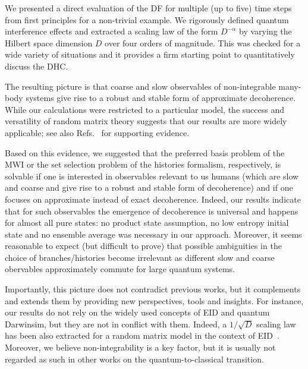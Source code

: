 \documentclass[pre,onecolumn,12pt,aps,longbibliography,nofootinbib]{revtex4-2}
\newcommand{\blue}[1]{#1}
\newcommand{\new}[1]{#1}
\begin{document}
We presented a direct evaluation of the DF for multiple (up to five) time steps from first principles for a non-trivial example. We rigorously defined quantum interference effects and extracted a scaling law of the form $D^{-\alpha}$ by varying the Hilbert space dimension $D$ over four orders of magnitude. \blue{This was checked for a wide variety of situations and it} provides a firm starting point to quantitatively discuss the DHC.

The resulting picture is that coarse and slow observables of non-integrable many-body systems give rise to a robust and stable form of approximate decoherence. \blue{While our calculations were restricted to a particular model, the success and versatility of random matrix theory suggests that our results are more widely applicable;} see also Refs.~\cite{VanKampenPhys1954, GemmerSteinigewegPRE2014, SchmidtkeGemmerPRE2016, NationPorrasPRE2020, AlbrechtBaunachArrasmithPRD2022, StrasbergEtAlPRA2023, StrasbergSP2023} for supporting evidence.

\blue{Based on this evidence, we suggested that the preferred basis problem of the MWI or the set selection problem of the histories formalism, respectively, is solvable if one is interested in observables relevant to us humans (which are slow and coarse and give rise to a robust and stable form of decoherence) and if one focuses on approximate instead of exact decoherence. Indeed, our results indicate that for such observables the emergence of decoherence is universal and happens for almost all pure states: no product state assumption, no low entropy initial state and no ensemble average was necessary in our approach. Moreover, it seems reasonable to expect (but difficult to prove) that possible ambiguities in the choice of branches/histories become irrelevant as different slow and coarse obervables approximately commute for large quantum systems.}

\new{Importantly,} this \new{picture} does not contradict previous works, but it complements and extends them by providing new perspectives, tools and insights. For instance, our results do not rely on the widely used concepts of EID and quantum Darwinsim, but they are not in conflict with them. \new{Indeed, a $1/\sqrt{D}$ scaling law has been also extracted for a random matrix model in the context of EID~\cite{HeWangPRE2014}.} Moreover, \new{we believe} non-integrability is a key factor, but it \new{is usually} not regarded as such in other works on the quantum-to-classical transition.
\end{document}
